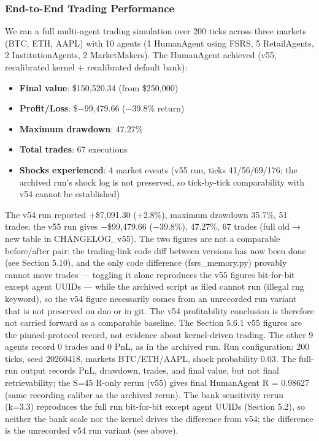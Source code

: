 \documentclass[11pt]{article}
\begin{document}
\subsubsection{End-to-End Trading Performance}
We ran a full multi-agent trading simulation over 200 ticks across three markets (BTC, ETH, AAPL) with 10 agents (1 HumanAgent using FSRS, 5 RetailAgents, 2 InstitutionAgents, 2 MarketMakers). The HumanAgent achieved (v55, recalibrated kernel + recalibrated default bank):

\begin{itemize}
\item \textbf{Final value}: \$150,520.34 (from \$250,000)
\item \textbf{Profit/Loss}: \$$-$99,479.66 ($-$39.8\% return)
\item \textbf{Maximum drawdown}: 47.27\%
\item \textbf{Total trades}: 67 executions
\item \textbf{Shocks experienced}: 4 market events (v55 run, ticks 41/56/69/176; the archived run's shock log is not preserved, so tick-by-tick comparability with v54 cannot be established)
\end{itemize}

The v54 run reported +\$7,091.30 (+2.8\%), maximum drawdown 35.7\%, 51 trades; the v55 run gives $-$\$99,479.66 ($-$39.8\%), 47.27\%, 67 trades (full old$\rightarrow$new table in CHANGELOG\_v55). The two figures are not a comparable before/after pair: the trading-link code diff between versions has now been done (see Section 5.10), and the only code difference (fsrs\_memory.py) provably cannot move trades --- toggling it alone reproduces the v55 figures bit-for-bit except agent UUIDs --- while the archived script as filed cannot run (illegal rng keyword), so the v54 figure necessarily comes from an unrecorded run variant that is not preserved on dao or in git. The v54 profitability conclusion is therefore not carried forward as a comparable baseline. The Section 5.6.1 v55 figures are the pinned-protocol record, not evidence about kernel-driven trading. The other 9 agents record 0 trades and 0 PnL, as in the archived run. Run configuration: 200 ticks, seed 20260418, markets BTC/ETH/AAPL, shock probability 0.03. The full-run output records PnL, drawdown, trades, and final value, but not final retrievability; the S=45 R-only rerun (v55) gives final HumanAgent R = 0.98627 (same recording caliber as the archived rerun). The bank sensitivity rerun (k=3.3) reproduces the full run bit-for-bit except agent UUIDs (Section 5.2), so neither the bank scale nor the kernel drives the difference from v54; the difference is the unrecorded v54 run variant (see above).
\end{document}
